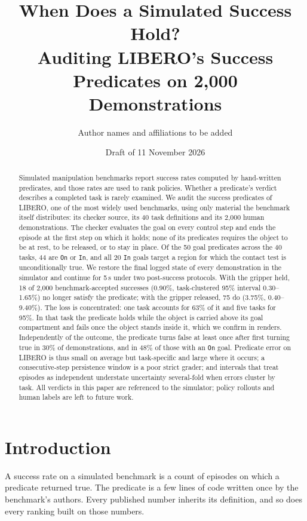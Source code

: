 \documentclass[10pt,twocolumn]{article}
\title{\textbf{When Does a Simulated Success Hold?\\ Auditing LIBERO's Success Predicates on 2{,}000 Demonstrations}}
\author{Author names and affiliations to be added}
\date{Draft of 11 November 2026}
\newcommand{\pred}[1]{\texttt{#1}}
\begin{document}
\maketitle

\begin{abstract}
Simulated manipulation benchmarks report success rates computed by hand-written predicates, and those rates are used to rank policies. Whether a predicate's verdict describes a completed task is rarely examined. We audit the success predicates of LIBERO, one of the most widely used benchmarks, using only material the benchmark itself distributes: its checker source, its 40 task definitions and its 2{,}000 human demonstrations. The checker evaluates the goal on every control step and ends the episode at the first step on which it holds; none of its predicates requires the object to be at rest, to be released, or to stay in place. Of the 50 goal predicates across the 40 tasks, 44 are \pred{On} or \pred{In}, and all 20 \pred{In} goals target a region for which the contact test is unconditionally true. We restore the final logged state of every demonstration in the simulator and continue for 5\,s under two post-success protocols. With the gripper held, 18 of 2{,}000 benchmark-accepted successes (0.90\%, task-clustered 95\% interval 0.30--1.65\%) no longer satisfy the predicate; with the gripper released, 75 do (3.75\%, 0.40--9.40\%). The loss is concentrated: one task accounts for 63\% of it and five tasks for 95\%. In that task the predicate holds while the object is carried above its goal compartment and fails once the object stands inside it, which we confirm in renders. Independently of the outcome, the predicate turns false at least once after first turning true in 30\% of demonstrations, and in 48\% of those with an \pred{On} goal. Predicate error on LIBERO is thus small on average but task-specific and large where it occurs; a consecutive-step persistence window is a poor strict grader; and intervals that treat episodes as independent understate uncertainty several-fold when errors cluster by task. All verdicts in this paper are referenced to the simulator; policy rollouts and human labels are left to future work.
\end{abstract}

\section{Introduction}

A success rate on a simulated benchmark is a count of episodes on which a predicate returned true. The predicate is a few lines of code written once by the benchmark's authors. Every published number inherits its definition, and so does every ranking built on those numbers.
\end{document}
